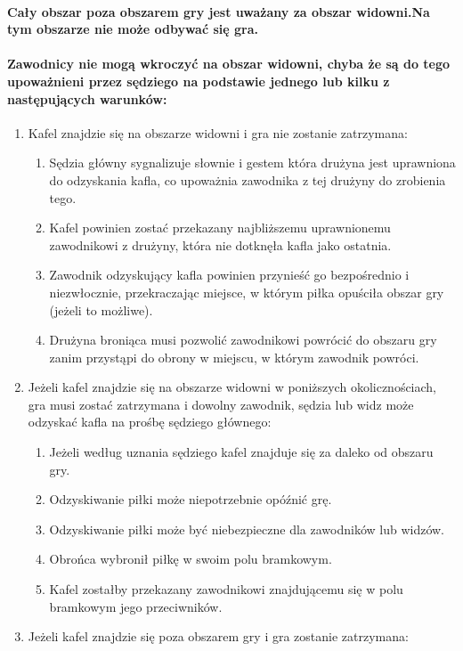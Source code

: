 \documentclass[12pt]{article}
\begin{document}
\paragraph{ Cały obszar poza obszarem gry jest uważany za obszar
	widowni.Na tym obszarze nie może odbywać się gra.}

\paragraph{ Zawodnicy nie mogą wkroczyć na obszar widowni, chyba
	że są do tego upoważnieni przez sędziego na podstawie jednego lub kilku
	z następujących warunków:}

\begin{enumerate}
	\item
	      Kafel znajdzie się na obszarze widowni i gra nie zostanie zatrzymana:

	      \begin{enumerate}
		      \item
		            Sędzia główny sygnalizuje słownie i gestem która drużyna jest
		            uprawniona do odzyskania kafla, co upoważnia zawodnika z tej drużyny
		            do zrobienia tego.
		      \item
		            Kafel powinien zostać przekazany najbliższemu uprawnionemu
		            zawodnikowi z drużyny, która nie dotknęła kafla jako ostatnia.
		      \item
		            Zawodnik odzyskujący kafla powinien przynieść go bezpośrednio i
		            niezwłocznie, przekraczając miejsce, w którym piłka opuściła obszar
		            gry (jeżeli to możliwe).
		      \item
		            Drużyna broniąca musi pozwolić zawodnikowi powrócić do obszaru gry
		            zanim przystąpi do obrony w miejscu, w którym zawodnik powróci.
	      \end{enumerate}
	\item
	      Jeżeli kafel znajdzie się na obszarze widowni w poniższych
	      okolicznościach, gra musi zostać zatrzymana i dowolny zawodnik, sędzia
	      lub widz może odzyskać kafla na prośbę sędziego głównego:

	      \begin{enumerate}
		      \item
		            Jeżeli według uznania sędziego kafel znajduje się za daleko od
		            obszaru gry.
		      \item
		            Odzyskiwanie piłki może niepotrzebnie opóźnić grę.
		      \item
		            Odzyskiwanie piłki może być niebezpieczne dla zawodników lub widzów.
		      \item
		            Obrońca wybronił piłkę w swoim polu bramkowym.
		      \item
		            Kafel zostałby przekazany zawodnikowi znajdującemu się w polu
		            bramkowym jego przeciwników.
	      \end{enumerate}
	\item
	      Jeżeli kafel znajdzie się poza obszarem gry i gra zostanie zatrzymana:


\end{enumerate}
\end{document}
